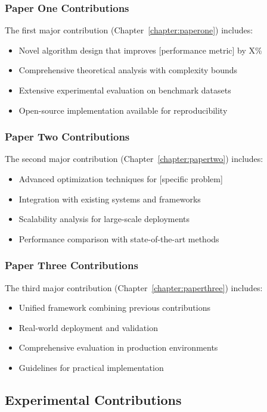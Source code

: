 \subsubsection{Paper One Contributions}
The first major contribution (Chapter~\ref{chapter:paperone}) includes:
\begin{itemize}
    \item Novel algorithm design that improves [performance metric] by X\%
    \item Comprehensive theoretical analysis with complexity bounds
    \item Extensive experimental evaluation on benchmark datasets
    \item Open-source implementation available for reproducibility
\end{itemize}

\subsubsection{Paper Two Contributions}
The second major contribution (Chapter~\ref{chapter:papertwo}) includes:
\begin{itemize}
    \item Advanced optimization techniques for [specific problem]
    \item Integration with existing systems and frameworks
    \item Scalability analysis for large-scale deployments
    \item Performance comparison with state-of-the-art methods
\end{itemize}

\subsubsection{Paper Three Contributions}
The third major contribution (Chapter~\ref{chapter:paperthree}) includes:
\begin{itemize}
    \item Unified framework combining previous contributions
    \item Real-world deployment and validation
    \item Comprehensive evaluation in production environments
    \item Guidelines for practical implementation
\end{itemize}

\subsection{Experimental Contributions}

